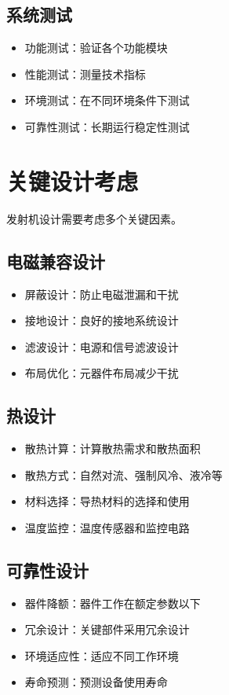 \documentclass[12pt,UTF8]{ctexbook}
\begin{document}
\subsection{系统测试}
\begin{itemize}[leftmargin=3.5em]
    \item 功能测试：验证各个功能模块
    \item 性能测试：测量技术指标
    \item 环境测试：在不同环境条件下测试
    \item 可靠性测试：长期运行稳定性测试
\end{itemize}

\section{关键设计考虑}

发射机设计需要考虑多个关键因素。

\subsection{电磁兼容设计}
\begin{itemize}[leftmargin=3.5em]
    \item 屏蔽设计：防止电磁泄漏和干扰
    \item 接地设计：良好的接地系统设计
    \item 滤波设计：电源和信号滤波设计
    \item 布局优化：元器件布局减少干扰
\end{itemize}

\subsection{热设计}
\begin{itemize}[leftmargin=3.5em]
    \item 散热计算：计算散热需求和散热面积
    \item 散热方式：自然对流、强制风冷、液冷等
    \item 材料选择：导热材料的选择和使用
    \item 温度监控：温度传感器和监控电路
\end{itemize}

\subsection{可靠性设计}
\begin{itemize}[leftmargin=3.5em]
    \item 器件降额：器件工作在额定参数以下
    \item 冗余设计：关键部件采用冗余设计
    \item 环境适应性：适应不同工作环境
    \item 寿命预测：预测设备使用寿命
\end{itemize}
\end{document}
